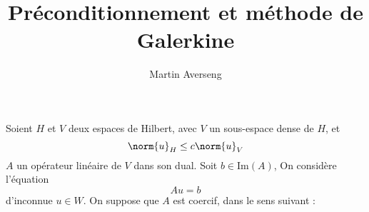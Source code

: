 \documentclass[]{article}
\title{Préconditionnement et méthode de Galerkine}
\author{Martin Averseng}
\begin{document}
	\maketitle
	Soient $H$ et $V$ deux espaces de Hilbert, avec $V$ un sous-espace dense de $H$, et 
	\[ \norm{u}_H \leq c \norm{u}_V\]
	$A$ un opérateur linéaire de $V$ dans son dual. Soit $b \in \text{Im}(A)$, On considère l'équation 
	\[Au = b\]
	d'inconnue $u \in W$. On suppose que $A$ est coercif, dans le sens suivant : 
\end{document}
